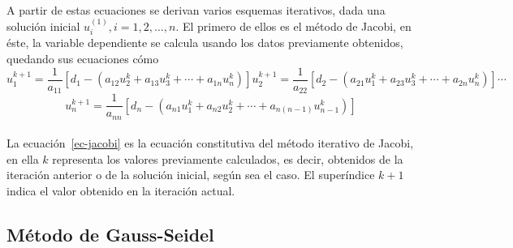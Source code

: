 \documentclass[letterpaper, openright, 12pt]{book}
\begin{document}
    \paragraph*{}
        A partir de estas ecuaciones se derivan varios esquemas iterativos, dada
        una solución inicial $u_{i}^{(1)}, i = 1, 2, \dotsc, n$. El primero de
        ellos es el método de Jacobi, en éste, la variable dependiente se
        calcula usando los datos previamente obtenidos, quedando sus ecuaciones
        cómo
        \begin{subequations}
            \begin{equation*}
                u_{1}^{k+1} = \frac{1}{a_{11}} \left[ d_{1} - \left( a_{12}u_{2}^{k} + a_{13}u_{3}^{k} + \dotsb + a_{1n}u_{n}^k \right) \right]
            \end{equation*}
            \begin{equation*}
                u_{2}^{k+1} = \frac{1}{a_{22}} \left[ d_{2} - \left( a_{21}u_{1}^{k} + a_{23}u_{3}^{k} + \dotsb + a_{2n}u_{n}^{k} \right) \right]
            \end{equation*}
            \begin{equation*}
                \dotsb
            \end{equation*}
        \end{subequations}
        \begin{equation}
            u_{n}^{k+1} = \frac{1}{a_{nn}} \left[ d_{n} - \left( a_{n1}u_{1}^{k} + a_{n2}u_{2}^{k} + \dotsb + a_{n\left( n-1 \right)}u_{n-1}^{k} \right) \right]
            \label{ec-jacobi}
        \end{equation}
    \paragraph*{}
        La ecuación~\ref{ec-jacobi} es la ecuación constitutiva del método
        iterativo de Jacobi, en ella $k$ representa los valores previamente
        calculados, es decir, obtenidos de la iteración anterior o de la
        solución inicial, según sea el caso. El superíndice $k+1$ indica el
        valor obtenido en la iteración actual.
    \subsection{Método de Gauss-Seidel}
\end{document}
